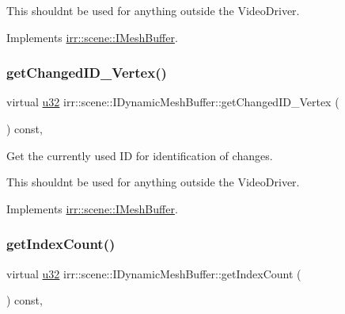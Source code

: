This shouldn\textquotesingle{}t be used for anything outside the Video\+Driver. 

Implements \hyperlink{classirr_1_1scene_1_1IMeshBuffer_aba48df31edf92a0117692c0be02298db}{irr\+::scene\+::\+I\+Mesh\+Buffer}.

\mbox{\label{classirr_1_1scene_1_1IDynamicMeshBuffer_a3480aae22a6701453a19b4c4cbcf2555}} 
\subsubsection{\texorpdfstring{get\+Changed\+I\+D\+\_\+\+Vertex()}{getChangedID\_Vertex()}\hspace{0.1cm}{\footnotesize\ttfamily [2/2]}}
{\footnotesize\ttfamily virtual \hyperlink{namespaceirr_a0416a53257075833e7002efd0a18e804}{u32} irr\+::scene\+::\+I\+Dynamic\+Mesh\+Buffer\+::get\+Changed\+I\+D\+\_\+\+Vertex (\begin{DoxyParamCaption}{ }\end{DoxyParamCaption}) const\hspace{0.3cm}{\ttfamily [inline]}, {\ttfamily [virtual]}}



Get the currently used ID for identification of changes. 

This shouldn\textquotesingle{}t be used for anything outside the Video\+Driver. 

Implements \hyperlink{classirr_1_1scene_1_1IMeshBuffer_aba48df31edf92a0117692c0be02298db}{irr\+::scene\+::\+I\+Mesh\+Buffer}.

\mbox{\label{classirr_1_1scene_1_1IDynamicMeshBuffer_adc483bdd7dfac4eb54e25c763ae1dae0}} 
\subsubsection{\texorpdfstring{get\+Index\+Count()}{getIndexCount()}\hspace{0.1cm}{\footnotesize\ttfamily [1/2]}}
{\footnotesize\ttfamily virtual \hyperlink{namespaceirr_a0416a53257075833e7002efd0a18e804}{u32} irr\+::scene\+::\+I\+Dynamic\+Mesh\+Buffer\+::get\+Index\+Count (\begin{DoxyParamCaption}{ }\end{DoxyParamCaption}) const\hspace{0.3cm}{\ttfamily [inline]}, {\ttfamily [virtual]}}



